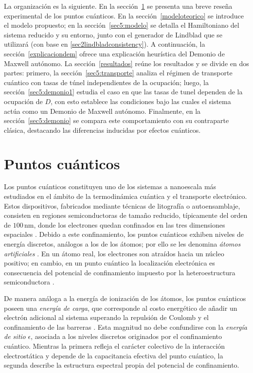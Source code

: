 La organización es la siguiente. En la sección~\ref{puntoscuanticos} se presenta una breve reseña experimental de los puntos cuánticos. En la sección~\ref{modeloteorico} se introduce el modelo propuesto; en la sección~\ref{sec5:modelo} se detalla el Hamiltoniano del sistema reducido y su entorno, junto con el generador de Lindblad que se utilizará (con base en \ref{sec2lindbladconsistency}). A continuación, la sección~\ref{explicaciondem} ofrece una explicación heurística del Demonio de Maxwell autónomo. La sección~\ref{resultados} reúne los resultados y se divide en dos partes: primero, la sección~\ref{sec5:transporte} analiza el régimen de transporte cuántico con tasas de túnel independientes de la ocupación; luego, la sección~\ref{sec5:demonio1} estudia el caso en que las tasas de tunel dependen de la ocupación de $D$, con esto establece las condiciones bajo las cuales el sistema actúa como un Demonio de Maxwell autónomo. Finalmente, en la sección~\ref{sec5:demonio} se compara este comportamiento con su contraparte clásica, destacando las diferencias inducidas por efectos cuánticos.

\section{Puntos cuánticos}
\label{puntoscuanticos}
Los puntos cuánticos constituyen uno de los sistemas a nanoescala más estudiados en el ámbito de la termodinámica cuántica y el transporte electrónico. Estos dispositivos, fabricados mediante técnicas de litografía o autoensamblaje, consisten en regiones semiconductoras de tamaño reducido, típicamente del orden de $100\,\text{nm}$, donde los electrones quedan confinados en las tres dimensiones espaciales \cite{hanson2007spins}. Debido a este confinamiento, los puntos cuánticos exhiben niveles de energía discretos, análogos a los de los átomos; por ello se les denomina \textit{átomos artificiales} \cite{kouwenhoven2001few}. En un átomo real, los electrones son atraídos hacia un núcleo positivo; en cambio, en un punto cuántico la localización electrónica es consecuencia del potencial de confinamiento impuesto por la heteroestructura semiconductora \cite{ashoori1996electrons}. 

De manera análoga a la energía de ionización de los átomos, los puntos cuánticos poseen una \textit{energía de carga}, que corresponde al costo energético de añadir un electrón adicional al sistema superando la repulsión de Coulomb y el confinamiento de las barreras \cite{hanson2007spins}. Esta magnitud no debe confundirse con la \textit{energía de sitio} $\epsilon$, asociada a los niveles discretos originados por el confinamiento cuántico. Mientras la primera refleja el carácter colectivo de la interacción electrostática y depende de la capacitancia efectiva del punto cuántico, la segunda describe la estructura espectral propia del potencial de confinamiento. 

